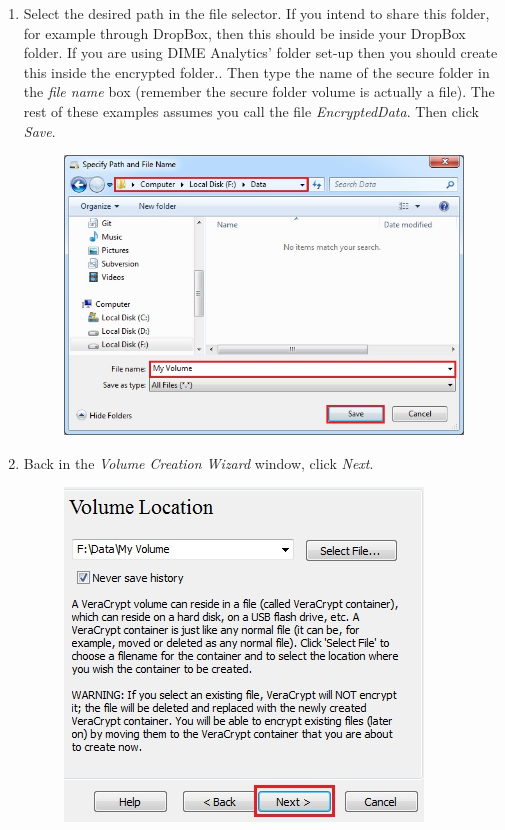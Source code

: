 \documentclass{tufte-handout}
\begin{document}
\begin{enumerate}
	\newpage
	
	\item Select the desired path in the file selector. If you intend to share this folder, for example through DropBox, then this should be inside your DropBox folder. If you are using DIME Analytics' folder set-up then you should create this inside the encrypted folder.. Then type the name of the secure folder in the \textit{file name} box (remember the secure folder volume is actually a file). The rest of these examples assumes you call the file \textit{EncryptedData}. Then click \textit{Save}.
	
	\begin{figure}%
		\includegraphics[width=.8\linewidth]{img/vc_install_5.png}
	\end{figure}
	\FloatBarrier
	
	
	\item Back in the \textit{Volume Creation Wizard} window, click \textit{Next}.
	\begin{figure}%
		\includegraphics[width=.8\linewidth]{img/vc_install_6.png}
	\end{figure}
	\FloatBarrier
	

\end{enumerate}
\end{document}
